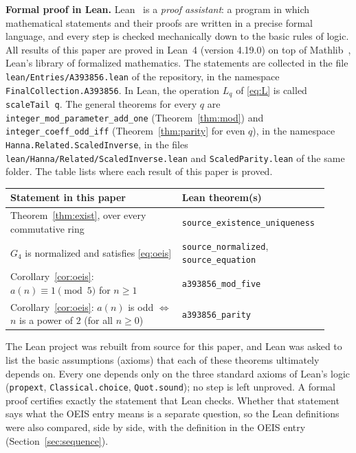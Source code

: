 \documentclass[11pt,a4paper]{article}
\theoremstyle{definition}
\theoremstyle{remark}
\newcommand{\para}[1]{\par\medskip\noindent\textbf{#1}\enspace}
\begin{document}
\para{Formal proof in Lean.}
Lean~\cite{lean} is a \emph{proof assistant}: a program in which mathematical statements and their proofs are written
in a precise formal language, and every step is checked mechanically down to the basic rules of logic. All results of
this paper are proved in Lean~4 (version 4.19.0) on top of Mathlib~\cite{mathlib}, Lean's library of formalized
mathematics. The statements are collected in the file \texttt{lean/Entries/A393856.lean} of the repository,
in the namespace \texttt{FinalCollection.A393856}. In Lean, the operation $L_q$ of \eqref{eq:L} is called \texttt{scaleTail q}. The general theorems for every $q$ are \texttt{integer\_mod\_parameter\_add\_one} (Theorem~\ref{thm:mod}) and \texttt{integer\_coeff\_odd\_iff} (Theorem~\ref{thm:parity} for even $q$), in the namespace \texttt{Hanna.\allowbreak Related.\allowbreak ScaledInverse}, in the files \texttt{lean/\allowbreak Hanna/\allowbreak Related/\allowbreak ScaledInverse.lean} and \texttt{ScaledParity.lean} of the same folder.
The table lists where each result of this paper is proved.
\begin{center}\small\renewcommand{\arraystretch}{1.25}
\begin{tabular}{>{\raggedright\arraybackslash}p{0.52\linewidth}>{\raggedright\arraybackslash}p{0.4\linewidth}}
\toprule
Statement in this paper & Lean theorem(s)\\
\midrule
Theorem~\ref{thm:exist}, over every commutative ring & \texttt{source\_\allowbreak{}existence\_\allowbreak{}uniqueness} \\
$G_{4}$ is normalized and satisfies \eqref{eq:oeis} & \texttt{source\_\allowbreak{}normalized}, \texttt{source\_\allowbreak{}equation} \\
Corollary~\ref{cor:oeis}: $a(n)\equiv1\pmod{5}$ for $n\ge1$ & \texttt{a393856\_\allowbreak{}mod\_\allowbreak{}five} \\
Corollary~\ref{cor:oeis}: $a(n)$ is odd $\iff$ $n$ is a power of $2$ (for all $n\ge0$) & \texttt{a393856\_\allowbreak{}parity} \\
\bottomrule
\end{tabular}
\end{center}
The Lean project was rebuilt from source for this paper, and Lean was asked to list the basic assumptions (axioms)
that each of these theorems ultimately depends on. Every one depends only on the three standard axioms of Lean's logic
(\texttt{propext}, \texttt{Classical.choice}, \texttt{Quot.sound}); no step is left unproved. A formal proof certifies
exactly the statement that Lean checks. Whether that statement says what the OEIS entry means is a separate question,
so the Lean definitions were also compared, side by side, with the definition in the OEIS entry
(Section~\ref{sec:sequence}).
\end{document}
